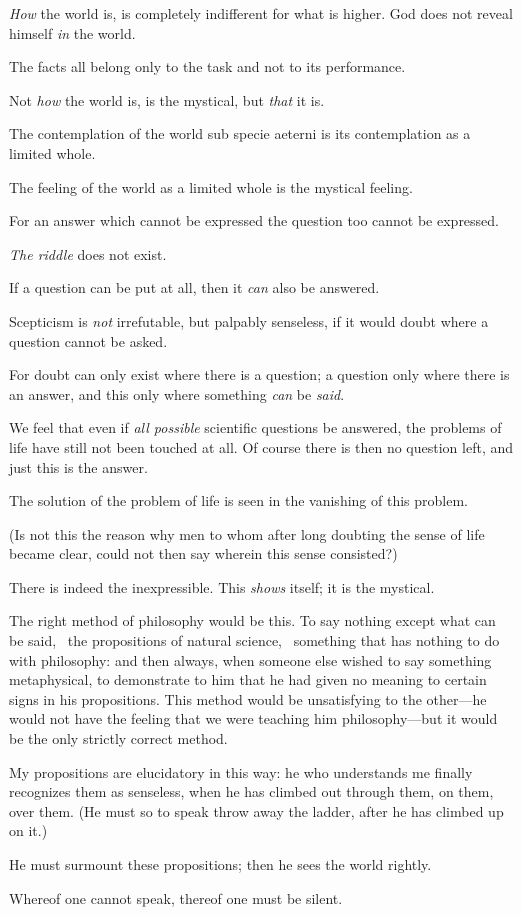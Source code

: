 {\emph{How} the world is, is completely indifferent for
what is higher. God does not reveal himself \emph{in} the
world.}


{The facts all belong only to the task and not to
its performance.}


{Not \emph{how} the world is, is the mystical, but \emph{that}
it is.}


{The contemplation of the world sub specie aeterni
is its contemplation as a limited whole.

The feeling of the world as a limited whole is
the mystical feeling.}


{For an answer which cannot be expressed the
question too cannot be expressed.

\emph{The riddle} does not exist.

If a question can be put at all, then it \emph{can} also
be answered.}


{Scepticism is \emph{not} irrefutable, but palpably senseless,
if it would doubt where a question cannot be
asked.

For doubt can only exist where there is a
question; a question only where there is an answer,
and this only where something \emph{can} be \emph{said}.}


{We feel that even if \emph{all possible} scientific
questions be answered, the problems of life have
still not been touched at all. Of course there is
then no question left, and just this is the
answer.}


{The solution of the problem of life is seen in the
vanishing of this problem.

(Is not this the reason why men to whom
after long doubting the sense of life became
clear, could not then say wherein this sense
consisted?)}


{There is indeed the inexpressible. This \emph{shows}
itself; it is the mystical.}


{The right method of philosophy would be this.
To say nothing except what can be said, \idEst\ the
propositions of natural science, \idEst\ something that
has nothing to do with philosophy: and then
always, when someone else wished to say something
metaphysical, to demonstrate to him that he
had given no meaning to certain signs in his
propositions. This method would be unsatisfying
to the other---he would not have the feeling that
we were teaching him philosophy---but it would be
the only strictly correct method.}


{My propositions are elucidatory in this way:
he who understands me finally recognizes them as
senseless, when he has climbed out through them,
on them, over them. (He must so to speak throw
away the ladder, after he has climbed up on it.)

He must surmount these propositions; then he
sees the world rightly.}


{Whereof one cannot speak, thereof one must be
silent.}
